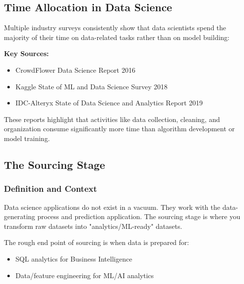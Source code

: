\documentclass[12pt]{article}
\begin{document}
\subsection{Time Allocation in Data Science}
\begin{tcolorbox}[colback=gray!10!white,colframe=gray!50!black,title={Research Findings}]
Multiple industry surveys consistently show that data scientists spend the majority of their time on data-related tasks rather than on model building:

\textbf{Key Sources:}
\begin{itemize}
    \item CrowdFlower Data Science Report 2016
    \item Kaggle State of ML and Data Science Survey 2018
    \item IDC-Alteryx State of Data Science and Analytics Report 2019
\end{itemize}

These reports highlight that activities like data collection, cleaning, and organization consume significantly more time than algorithm development or model training.
\end{tcolorbox}

\subsection{The Sourcing Stage}

\subsubsection{Definition and Context}
\begin{tcolorbox}[colback=yellow!5!white,colframe=yellow!75!black,title={Key Insight}]
Data science applications do not exist in a vacuum. They work with the data-generating process and prediction application. The sourcing stage is where you transform raw datasets into "analytics/ML-ready" datasets.

The rough end point of sourcing is when data is prepared for:
\begin{itemize}
    \item SQL analytics for Business Intelligence
    \item Data/feature engineering for ML/AI analytics
\end{itemize}
\end{tcolorbox}
\end{document}
